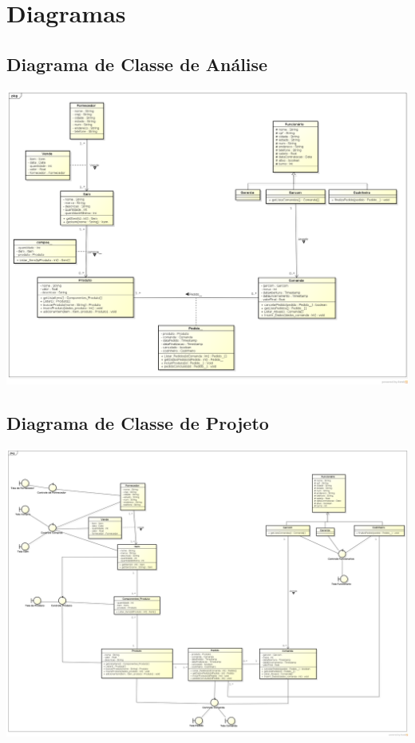 \let\cleardoublepage\clearpage
\newpage
\section{Diagramas}
\subsection{Diagrama de Classe de Análise}
 \centerline{
\includegraphics[scale=0.38,angle=90]{diagrama/Diagrama_de_Classe.png}
}
\let\cleardoublepage\clearpage
\newpage
\subsection{Diagrama de Classe de Projeto}
\centerline{
\includegraphics[scale=0.3,angle=90]{diagrama/Diagrama_de_Classe_Completo.png}
}

